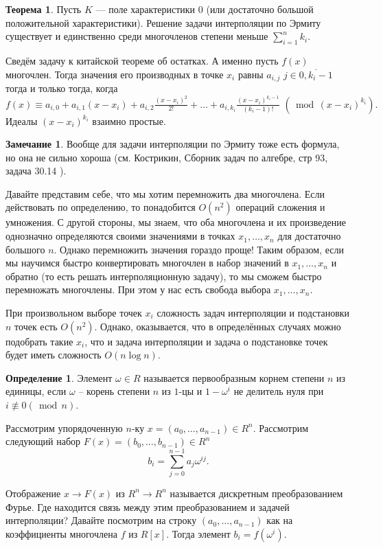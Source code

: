 \documentclass[10pt,a4paper,oneside]{book} %
\theoremstyle{definition}
\newtheorem*{rem}{Замечание}
\newtheorem*{defn}{Определение}
\newtheorem{thm}{Теорема}
\renewcommand{\mod}{\,\operatorname{mod}\,}
\newcommand{\ovl}{\overline}
\newcommand{\nequiv}{\not \equiv}
\def\thrm{\begin{thm}}
\def\ethrm{\end{thm}}
\def\dfn{\begin{defn}}
\def\edfn{\end{defn}}
\def\rm{\begin{rem}}
\def\erm{\end{rem}}
\begin{document}
\thrm Пусть $K$ --- поле характеристики 0 (или достаточно большой положительной характеристики). Решение задачи интерполяции по Эрмиту существует и единственно среди многочленов степени меньше $\sum_{i=1}^n k_i$.
\ethrm
\proof Сведём задачу к китайской теореме об остатках. А именно пусть $f(x)$ многочлен. Тогда значения его производных в точке $x_i$ равны $a_{i,j}$ $j\in \ovl{0,k_i-1}$ тогда и только тогда, когда 
$$f(x)\equiv a_{i,0}+a_{i,1}(x-x_i)+a_{i,2}\tfrac{(x-x_i)^2}{2!}+\dots+ a_{i,k_i}\tfrac{(x-x_i)^{k_i-1}}{(k_i-1)!}\,\, (\mod (x-x_i)^{k_i}).$$
Идеалы $(x-x_i)^{k_i}$ взаимно простые.
\endproof

\rm Вообще для  задачи интерполяции по Эрмиту тоже есть формула, но она не сильно хороша (см. Кострикин, Сборник задач по алгебре, стр 93, задача 30.14 ).\erm


Давайте представим себе, что мы хотим перемножить два многочлена. Если действовать по определению, то понадобится $O(n^2)$ операций сложения и умножения. С другой стороны, мы знаем, что оба многочлена и их произведение однозначно определяются своими значениями в точках $x_1,\dots, x_n$ для достаточно большого $n$. Однако перемножить значения гораздо проще! Таким образом, если мы научимся быстро конвертировать многочлен в набор значений в $x_1,\dots, x_n$ и обратно (то есть решать интерполяционную задачу), то мы сможем быстро перемножать многочлены. При этом у нас есть свобода выбора $x_1,\dots, x_n$. 

При произвольном выборе точек $x_i$ сложность задач интерполяции и подстановки $n$ точек есть $O(n^2)$. Однако, оказывается, что в определённых случаях можно подобрать такие $x_i$, что и задача интерполяции и задача о подстановке точек будет иметь сложность $O(n\log n)$. 

\dfn Элемент  $\omega \in R$ называется первообразным корнем  степени $n$ из единицы, если $\omega$ -- корень степени $n$ из $1$-цы и $1-\omega^i$ не делитель нуля при $i\nequiv 0(\mod n)$.
\edfn




Рассмотрим упорядоченную $n$-ку $x=(a_0,\dots,a_{n-1})\in R^n$. Рассмотрим следующий набор $F(x)=(b_0,\dots,b_{n-1})\in R^n$ 
$$b_i=\sum_{j=0}^{n-1} a_j \omega^{ij}.$$

Отображение $x \to F(x)$ из $ R^n \to R^n$ называется дискретным преобразованием Фурье. Где находится связь между этим преобразованием и задачей интерполяции? Давайте посмотрим на строку $(a_0,\dots,a_{n-1})$ как на коэффициенты многочлена $f$ из $R[x]$. Тогда элемент $b_i=f(\omega^i)$.
\end{document}
